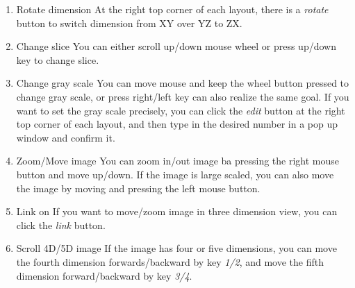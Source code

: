 \documentclass[12pt]{article}
\begin{document}
\begin{enumerate}
	\item Rotate dimension
	\newline At the right top corner of each layout, there is a \textit{rotate} button to switch dimension from XY over YZ to ZX.
	\item Change slice
	\newline You can either scroll up/down mouse wheel or press up/down key to change slice.
	\item Change gray scale
	\newline You can move mouse and keep the wheel button pressed to change gray scale, or press right/left key can also realize the same goal. If you want to set the gray scale precisely, you can click the \textit{edit} button at the right top corner of each layout, and then type in the desired number in a pop up window and confirm it.
	\item Zoom/Move image
	\newline You can zoom in/out image ba pressing the right mouse button and move up/down. If the image is large scaled, you can also move the image by moving and pressing the left mouse button.
	\item Link on
	\newline If you want to move/zoom image in three dimension view, you can click the \textit{link} button. 
	\item Scroll 4D/5D image
	\newline If the image has four or five dimensions, you can move the fourth dimension forwards/backward by key \textit{1/2}, and move the fifth dimension forward/backward by key \textit{3/4}.
\end{enumerate}
\end{document}

